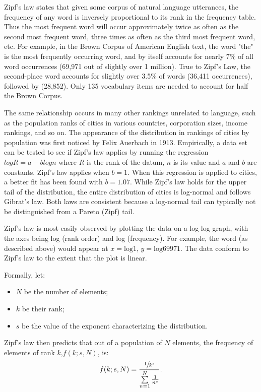       Zipf's law states that given some corpus of natural language utterances, the frequency of any word is inversely proportional to its rank in the frequency table. Thus the most frequent word will occur approximately twice as often as the second most frequent word, three times as often as the third most frequent word, etc. For example, in the Brown Corpus of American English text, the word "the" is the most frequently occurring word, and by itself accounts for nearly 7\% of all word occurrences (69,971 out of slightly over 1 million). True to Zipf's Law, the second-place word  accounts for slightly over 3.5\% of words (36,411 occurrences), followed by  (28,852). Only 135 vocabulary items are needed to account for half the Brown Corpus.
  
      The same relationship occurs in many other rankings unrelated to language, such as the population ranks of cities in various countries, corporation sizes, income rankings, and so on. The appearance of the distribution in rankings of cities by population was first noticed by Felix Auerbach in 1913\cite{Auerbach1913}. Empirically, a data set can be tested to see if Zipf's law applies by running the regression $log R = a - b log n$ where $R$ is the rank of the datum, $n$ is its value and $a$ and $b$ are constants. Zipf's law applies when $b = 1$. When this regression is applied to cities, a better fit has been found with $b = 1.07$. While Zipf's law holds for the upper tail of the distribution, the entire distribution of cities is log-normal and follows Gibrat's law\cite{Eeckhout2004}. Both laws are consistent because a log-normal tail can typically not be distinguished from a Pareto (Zipf) tail.

      Zipf's law is most easily observed by plotting the data on a log-log graph, with the axes being log (rank order) and log (frequency). For example, the word  (as described above) would appear at $x = \mbox{log}1$, $y = \mbox{log}69971$. The data conform to Zipf's law to the extent that the plot is linear.
      
      Formally, let:
      \begin{itemize}
        \item $N$ be the number of elements;
        \item $k$ be their rank;
        \item $s$ be the value of the exponent characterizing the distribution.
      \end{itemize}
      Zipf's law then predicts that out of a population of $N$ elements, the frequency of elements of rank $k\mbox{,} f(k;s,N)$, is:
      \begin{equation}
        f(k;s,N)=\frac{\sfrac{1}{k^s}}{\sum\limits_{n=1}^N \frac{1}{n^s}}\mbox{.}
      \end{equation}

